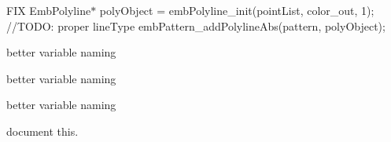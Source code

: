 \begin{DoxyRefList}
%
FIX Emb\+Polyline$\ast$ poly\+Object = emb\+Polyline\+\_\+init(point\+List, color\+\_\+out, 1); //\+TODO\+: proper line\+Type emb\+Pattern\+\_\+add\+Polyline\+Abs(pattern, poly\+Object);  
\item[Member \mbox{\hyperlink{struct_sub_descriptor___affb2c75b7f632338f368aafab49f678d}{Sub\+Descriptor\+\_\+\+::color\+Code}} ]\label{todo__todo000209}%
%
better variable naming  
\item[Member \mbox{\hyperlink{struct_sub_descriptor___a0cfe04519ff6dab092ee7c002e55e520}{Sub\+Descriptor\+\_\+\+::some\+Int}} ]\label{todo__todo000207}%
%
better variable naming  
\item[Member \mbox{\hyperlink{struct_sub_descriptor___a6154b0f4ec7815c6d26c71852506418e}{Sub\+Descriptor\+\_\+\+::some\+Other\+Int}} ]\label{todo__todo000208}%
%
better variable naming  
\item[Member \mbox{\hyperlink{embroidermodder_8h_a459ace9a6c614fe41b7f08ba91bc6dd4}{Undo\+History}} ]\label{todo__todo000001}%
%
document this. 
\end{DoxyRefList}